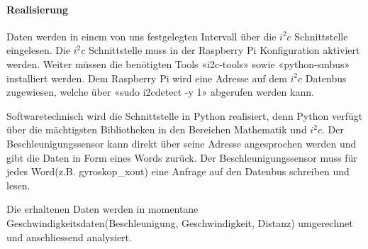 \documentclass[../../main.tex]{subfiles}
\begin{document}
\paragraph{Realisierung}
Daten werden in einem von uns festgelegten Intervall über die $i^2c$ Schnittstelle eingelesen. Die $i^2c$ Schnittstelle muss in der Raspberry Pi Konfiguration aktiviert werden. Weiter müssen die benötigten Tools «i2c-tools» sowie «python-smbus» installiert werden. Dem Raspberry Pi wird eine Adresse auf dem $i^2c$ Datenbus zugewiesen, welche über «sudo i2cdetect -y 1» abgerufen werden kann.

Softwaretechnisch wird die Schnittstelle in Python realisiert, denn Python verfügt über die mächtigsten Bibliotheken in den Bereichen Mathematik und $i^2c$. Der Beschleunigungssensor kann direkt über seine Adresse angesprochen werden und gibt die Daten in Form eines Words zurück. Der Beschleunigungssensor muss für jedes Word(z.B. gyroskop\_xout) eine Anfrage auf den Datenbus schreiben und lesen.

Die erhaltenen Daten werden in momentane Geschwindigkeitsdaten(Beschleunigung, Geschwindigkeit, Distanz) umgerechnet und anschliessend analysiert.
\end{document}
